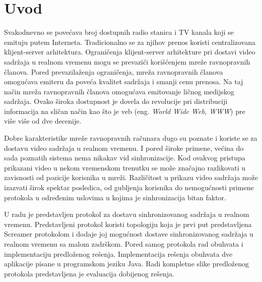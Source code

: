 \documentclass[12pt,oneside]{memoir}
\begin{document}
\frontmatter
\naslovna
\komisija
\apstrakt
\tableofcontents*

\mainmatter

\chapter{Uvod}
Svakodnevno se povećava broj dostupnih radio stanica i TV kanala koji se emituju putem Interneta. Tradicionalno se za njihov prenos koristi centralizovana klijent-server arhitektura. Ograničenja klijent-server arhitekture pri dostavi video sadržaja u realnom vremenu mogu se prevazići korišćenjem mreže ravnopravnih članova. Pored prevazilaženja ograničenja, mreža ravnopravnih članova omogućava emiteru da poveća kvalitet sadržaja i smanji cenu prenosa. Na taj način mreža ravnopravnih članova omogućava emitovanje ličnog medijskog sadržaja. Ovako široka dostupnost je dovela do revolucije pri distribuciji informacija na sličan način kao što je veb (eng. \textit{World Wide Web, WWW}) pre više više od dve decenije.

Dobre karakteristike mreže ravnopravnih računara dugo su poznate i koriste se za dostavu video sadržaja u realnom vremenu. I pored široke primene, većina do sada poznatih sistema nema nikakav vid sinhronizacije. Kod ovakvog pristupa prikazani video u nekom vremenskom trenutku se može značajno razlikovati u zavisnosti od pozicije korisnika u mreži. Različitost u prikazu video sadržaja može izazvati širok spektar posledica, od gubljenja korisnika do nemogućnosti primene protokola u određenim uslovima u kojima je sinhronizacija bitan faktor.

U radu je predstavljen protokol za dostavu sinhronizovanog sadržaja u realnom vremenu. Predstavljeni protokol koristi topologiju koja je prvi put predstavljena Screamer protokolom i dodaje joj mogućnost dostave sinhronizovanog sadržaja u realnom vremenu sa malom zadrškom. Pored samog protokola rad obuhvata i implementaciju predloženog rešenja. Implementacija rešenja obuhvata dve aplikacije pisane u programskom jeziku Java. Radi kompletne slike predloženog protokola predstavljena je evaluacija dobijenog rešenja. 
  
\end{document}
